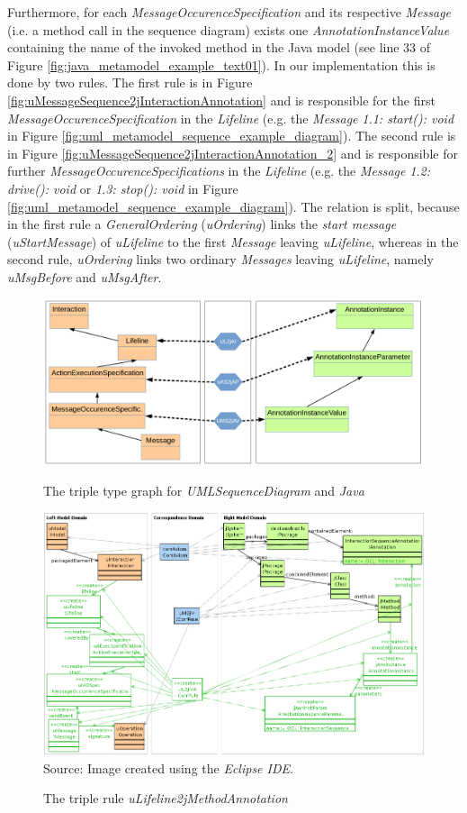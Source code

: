\documentclass[tuberlin,cic,tc,english,noabntcite, oneside]{iiufrgs}
\begin{document}
Furthermore, for each \emph{MessageOccurenceSpecification} and its respective \emph{Message} (i.e. a method call in the sequence diagram) exists one \emph{AnnotationInstanceValue} containing the name of the invoked method in the Java model (see line 33 of Figure \ref{fig:java_metamodel_example_text01}). In our implementation this is done by two rules. The first rule is in Figure \ref{fig:uMessageSequence2jInteractionAnnotation} and is responsible for the first \emph{MessageOccurenceSpecification} in the \emph{Lifeline} (e.g. the \emph{Message} \emph{1.1: start(): void} in Figure  \ref{fig:uml_metamodel_sequence_example_diagram}). The second rule is in Figure \ref{fig:uMessageSequence2jInteractionAnnotation_2} and is responsible for further \emph{MessageOccurenceSpecifications} in the \emph{Lifeline} (e.g. the \emph{Message} \emph{1.2: drive(): void} or \emph{1.3: stop(): void} in Figure  \ref{fig:uml_metamodel_sequence_example_diagram}). The relation is split, because in the first rule a \emph{GeneralOrdering} (\emph{uOrdering}) links the \emph{start message} (\emph{uStartMessage}) of \emph{uLifeline} to the first \emph{Message} leaving \emph{uLifeline}, whereas in the second rule, \emph{uOrdering} links two ordinary \emph{Messages} leaving \emph{uLifeline}, namely \emph{uMsgBefore} and \emph{uMsgAfter}.

\begin{figure}[H]
	\centering
    \caption{The triple type graph for \emph{UMLSequenceDiagram} and \emph{Java}}
    \includegraphics[width=.7\textwidth]{umlSequenceDiagram2java_type}
    \label{fig:umlSequenceDiagram2java_type}
\end{figure}

\begin{figure}[H]
	\centering
    \caption{The triple rule \emph{uLifeline2jMethodAnnotation}}
    \includegraphics[width=\textwidth]{uILifeline2jMAnnotation} \\
    Source: Image created using the \emph{Eclipse IDE}.
    \label{fig:uILifeline2jMAnnotation}
\end{figure}
\end{document}
